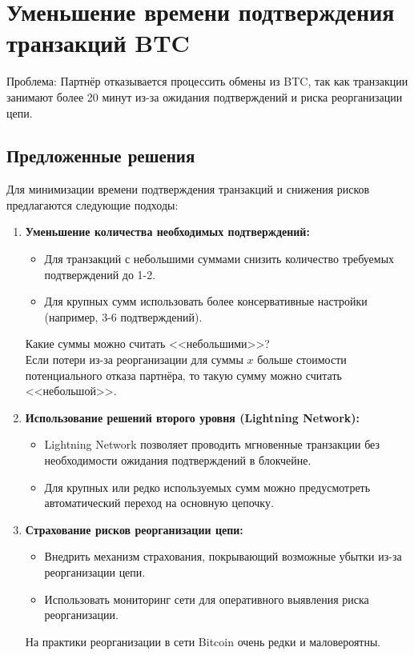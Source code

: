 \documentclass[12pt]{article}
\theoremstyle{indented}
\theoremstyle{definition}
\theoremstyle{remark}
\begin{document}
\section{Уменьшение времени подтверждения транзакций BTC}

Проблема: Партнёр отказывается процессить обмены из BTC, так как транзакции занимают более 20 минут из-за ожидания подтверждений и риска реорганизации цепи.

\subsection*{Предложенные решения}
Для минимизации времени подтверждения транзакций и снижения рисков предлагаются следующие подходы:

\begin{enumerate}
    \item \textbf{Уменьшение количества необходимых подтверждений:}
    \begin{itemize}
        \item Для транзакций с небольшими суммами снизить количество требуемых подтверждений до 1-2.
        \item Для крупных сумм использовать более консервативные настройки (например, 3-6 подтверждений).
    \end{itemize}
    Какие суммы можно считать <<небольшими>>? \\
    Если потери из-за реорганизации для суммы $x$ больше стоимости потенциального отказа партнёра, то такую сумму можно считать <<небольшой>>.

    \item \textbf{Использование решений второго уровня (Lightning Network):}
    \begin{itemize}
        \item Lightning Network позволяет проводить мгновенные транзакции без необходимости ожидания подтверждений в блокчейне.
        \item Для крупных или редко используемых сумм можно предусмотреть автоматический переход на основную цепочку.
    \end{itemize}

    \item \textbf{Страхование рисков реорганизации цепи:}
    \begin{itemize}
        \item Внедрить механизм страхования, покрывающий возможные убытки из-за реорганизации цепи.
        \item Использовать мониторинг сети для оперативного выявления риска реорганизации.
    \end{itemize}
    На практики реорганизации в сети Bitcoin очень редки и маловероятны.
\end{enumerate}
\end{document}
